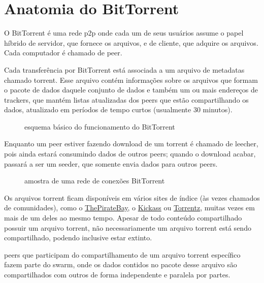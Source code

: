 
\chapter{Anatomia do BitTorrent}

O BitTorrent é uma rede \gls{p2p} onde cada um de seus usuários assume o papel híbrido
de servidor, que fornece os arquivos, e de cliente, que adquire os arquivos. Cada
computador é chamado de \gls{peer}.

Cada transferência por BitTorrent está associada a um arquivo de \glspl{metadata}
chamado \gls{torrent}. Esse arquivo contém informações sobre os arquivos que formam o
pacote de dados daquele conjunto de dados e também um ou mais endereços de
\glspl*{tracker}, que mantém listas atualizadas dos \glspl*{peer} que estão
compartilhando os dados, atualizado em períodos de tempo curtos (usualmente 30 minutos).

\begin{figure}[H]
    \centering
    \caption{esquema básico do funcionamento do BitTorrent}
    \label{fig:torrent-basics}
\end{figure}

Enquanto um \gls*{peer} estiver fazendo download de um \gls*{torrent} é chamado de
\gls{leecher}, pois ainda estará consumindo dados de outros \glspl*{peer}; quando o
download acabar, passará a ser um \gls{seeder}, que somente envia dados para outros
\glspl*{peer}.

\begin{figure}[H]
    \centering
    \caption{amostra de uma rede de conexões BitTorrent}
    \label{fig:torrent-universo}
\end{figure}

Os arquivos \gls*{torrent} ficam disponíveis em vários sites de índice (às vezes
chamados de comunidades), como o \href{http://thepiratebay.sx/}{ThePirateBay}, o
\href{http://kickass.to/}{Kickass} ou \href{https://torrentz.eu/}{Torrentz}, muitas
vezes em mais de um deles ao mesmo tempo. Apesar de todo conteúdo compartilhado possuir
um arquivo \gls*{torrent}, não necessariamente um arquivo \gls*{torrent} está sendo
compartilhado, podendo inclusive estar extinto.

\Glspl*{peer} que participam do compartilhamento de um arquivo \gls*{torrent} específico
fazem parte do \gls{swarm}, onde os dados contidos no pacote desse arquivo são
compartilhados com outros de forma independente e paralela por partes.


